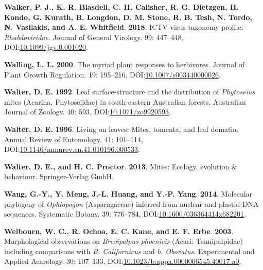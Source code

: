 \documentclass[12pt,final,CPage]{ufthesis}
\newlength{\cslhangindent}
\newenvironment{CSLReferences}[2] %
{%
	\setlength{\parindent}{0pt}
	\ifodd #1 \everypar{\setlength{\hangindent}{\cslhangindent}}\ignorespaces\fi
	\ifnum #2 > 0
	\setlength{\parskip}{#2\baselineskip}
	\fi
}%
{}
\begin{document}
{\begin{CSLReferences}{1}{0}
  \leavevmode{}%
  \textbf{Walker, P. J., K. R. Blasdell, C. H. Calisher, R. G. Dietzgen, H. Kondo, G. Kurath, B. Longdon, D. M. Stone, R. B. Tesh, N. Tordo, N. Vasilakis, and A. E. Whitfield}. \textbf{2018}. {ICTV} virus taxonomy profile: {\emph{Rhabdoviridae}}. Journal of General Virology. 99: 447--448, DOI:\href{https://doi.org/10.1099/jgv.0.001020}{10.1099/jgv.0.001020}.

  \leavevmode{}%
  \textbf{Walling, L. L.} \textbf{2000}. The myriad plant responses to herbivores. Journal of Plant Growth Regulation. 19: 195--216, DOI:\href{https://doi.org/10.1007/s003440000026}{10.1007/s003440000026}.

  \leavevmode{}%
  \textbf{Walter, D. E.} \textbf{1992}. Leaf surface-structure and the distribution of {\emph{Phytoseius}} mites ({Acarina}, {Phytoseiidae}) in south-eastern {Australian} forests. Australian Journal of Zoology. 40: 593, DOI:\href{https://doi.org/10.1071/zo9920593}{10.1071/zo9920593}.

  \leavevmode{}%
  \textbf{Walter, D. E.} \textbf{1996}. Living on leaves: Mites, tomenta, and leaf domatia. Annual Review of Entomology. 41: 101--114, DOI:\href{https://doi.org/10.1146/annurev.en.41.010196.000533}{10.1146/annurev.en.41.010196.000533}.

  \leavevmode{}%
  \textbf{Walter, D. E., and H. C. Proctor}. \textbf{2013}. Mites: Ecology, evolution \& behaviour. Springer-Verlag GmbH.

  \leavevmode{}%
  \textbf{Wang, G.-Y., Y. Meng, J.-L. Huang, and Y.-P. Yang}. \textbf{2014}. Molecular phylogeny of {\emph{Ophiopogon}} {({Asparagaceae})} inferred from nuclear and plastid {DNA} sequences. Systematic Botany. 39: 776--784, DOI:\href{https://doi.org/10.1600/036364414x682201}{10.1600/036364414x682201}.

  \leavevmode{}%
  \textbf{Welbourn, W. C., R. Ochoa, E. C. Kane, and E. F. Erbe}. \textbf{2003}. Morphological observations on {\emph{Brevipalpus phoenicis}} ({Acari}: {Tenuipalpidae}) including comparisons with {\emph{B. Californicus}} and {\emph{b. Obovatus}}. Experimental and Applied Acarology. 30: 107--133, DOI:\href{https://doi.org/10.1023/b:appa.0000006545.40017.a0}{10.1023/b:appa.0000006545.40017.a0}.


\end{CSLReferences}}
\end{document}

